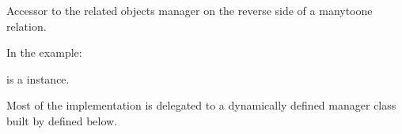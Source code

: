 \documentclass[a4paper,11pt,spanish]{sphinxmanual}
\begin{document}
\begin{fulllineitems}
\begin{fulllineitems}
\end{fulllineitems}


\begin{fulllineitems}
\label{\detokenize{api/inventory/inventory.models:inventory.models.InventoryConfig.main_location_id}}
\pysigstartsignatures
\pysigline
{}
\pysigstopsignatures
\end{fulllineitems}


\begin{fulllineitems}
\label{\detokenize{api/inventory/inventory.models:inventory.models.InventoryConfig.movements}}
\pysigstartsignatures
\pysigline
{}
\pysigstopsignatures
\sphinxAtStartPar
Accessor to the related objects manager on the reverse side of a
many\sphinxhyphen{}to\sphinxhyphen{}one relation.

\sphinxAtStartPar
In the example:

\begin{sphinxVerbatim}[commandchars=\\\{\}]
       
\end{sphinxVerbatim}

\sphinxAtStartPar
{} is a  instance.

\sphinxAtStartPar
Most of the implementation is delegated to a dynamically defined manager
class built by  defined below.

\end{fulllineitems}


\begin{fulllineitems}
\label{\detokenize{api/inventory/inventory.models:inventory.models.InventoryConfig.objects}}
\pysigstartsignatures
\pysigline
{}
\pysigstopsignatures
\end{fulllineitems}


\end{fulllineitems}
\end{document}
